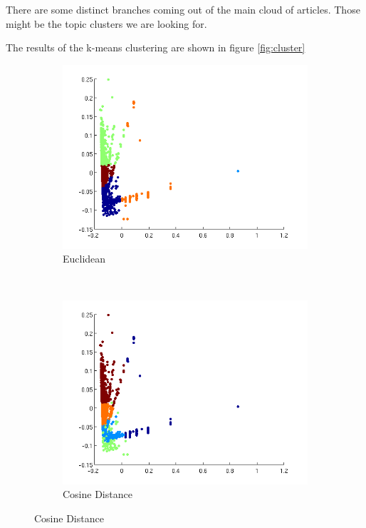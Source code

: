 \documentclass[a4paper,10pt]{article}
\begin{document}
There are some distinct branches coming out of the main cloud of articles. Those might be the topic clusters we are looking for. 

The results of the k-means clustering are shown in figure \ref{fig:cluster}

\begin{figure}[h!]
        \centering
        \begin{subfigure}[b]{0.4\textwidth}
                \includegraphics[width=\textwidth]{Images/classified1.png}
                \caption{Euclidean}
    			\label{fig:euclidean}
        \end{subfigure}
        ~
		\begin{subfigure}[b]{0.4\textwidth}
                \includegraphics[width=\textwidth]{Images/cosine.png}
                \caption{Cosine Distance}
    			\label{fig:cosine}
        \end{subfigure}     
                                    

\end{figure}
\end{document}
